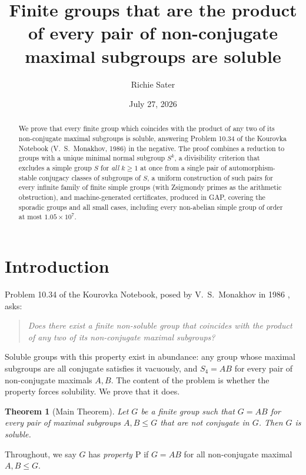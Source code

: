 \documentclass[11pt]{amsart}
\title[Groups factorized by non-conjugate maximal subgroups]{Finite groups
that are the product of every pair of non-conjugate maximal subgroups are
soluble}
\author{Richie Sater}
\date{July 27, 2026}
\newtheorem{theorem}{Theorem}[section]
\theoremstyle{definition}
\theoremstyle{remark}
\begin{document}
\begin{abstract}
We prove that every finite group which coincides with the product of any
two of its non-conjugate maximal subgroups is soluble, answering Problem
10.34 of the Kourovka Notebook (V.~S.~Monakhov, 1986) in the negative.
The proof combines a reduction to groups with a unique minimal normal
subgroup $S^k$, a divisibility criterion that excludes a simple group $S$
for \emph{all} $k\geq 1$ at once from a single pair of automorphism-stable
conjugacy classes of subgroups of $S$, a uniform construction of such
pairs for every infinite family of finite simple groups (with Zsigmondy
primes as the arithmetic obstruction), and machine-generated certificates,
produced in GAP, covering the sporadic groups and all small cases,
including every non-abelian simple group of order at most
$1.05\times 10^{7}$.
\end{abstract}

\maketitle

\section{Introduction}\label{sec:intro}

Problem 10.34 of the Kourovka Notebook, posed by V.~S.~Monakhov in 1986
\cite{Kourovka}, asks:

\begin{quote}
\emph{Does there exist a finite non-soluble group that coincides with the
product of any two of its non-conjugate maximal subgroups?}
\end{quote}

Soluble groups with this property exist in abundance: any group
whose maximal subgroups are all conjugate satisfies it vacuously,
and $S_4 = AB$ for every pair of non-conjugate maximals $A,B$. The content
of the problem is whether the property forces solubility. We prove that it
does.

\begin{theorem}[Main Theorem]\label{thm:main}
Let $G$ be a finite group such that $G=AB$ for every pair of maximal
subgroups $A,B\leq G$ that are not conjugate in $G$. Then $G$ is soluble.
\end{theorem}

Throughout, we say $G$ has \emph{property $\mathrm{P}$} if $G=AB$ for all
non-conjugate maximal $A,B\leq G$.
\end{document}
